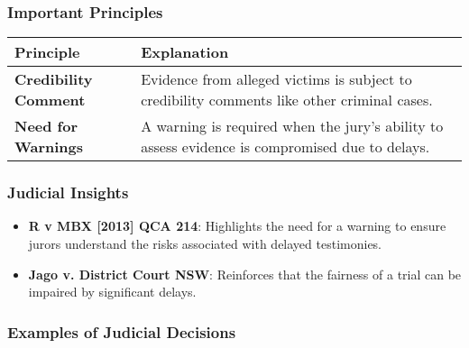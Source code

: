 \subsubsection{Important Principles}\label{important-principles}

\begin{longtable}[]{@{}
  >{\raggedright\arraybackslash}p{}
  >{\raggedright\arraybackslash}p{}@{}}
\toprule\noalign{}
\begin{minipage}[b]{\linewidth}\raggedright
Principle
\end{minipage} & \begin{minipage}[b]{\linewidth}\raggedright
Explanation
\end{minipage} \\
\midrule\noalign{}
\endhead
\bottomrule\noalign{}
\endlastfoot
\textbf{Credibility Comment} & Evidence from alleged victims is subject
to credibility comments like other criminal cases. \\
\textbf{Need for Warnings} & A warning is required when the jury's
ability to assess evidence is compromised due to delays. \\
\end{longtable}

\subsubsection{Judicial Insights}\label{judicial-insights}

\begin{itemize}
\item
  \textbf{R v MBX {[}2013{]} QCA 214}: Highlights the need for a warning
  to ensure jurors understand the risks associated with delayed
  testimonies.
\item
  \textbf{Jago v. District Court NSW}: Reinforces that the fairness of a
  trial can be impaired by significant delays.
\end{itemize}

\subsubsection{Examples of Judicial
Decisions}\label{examples-of-judicial-decisions}

